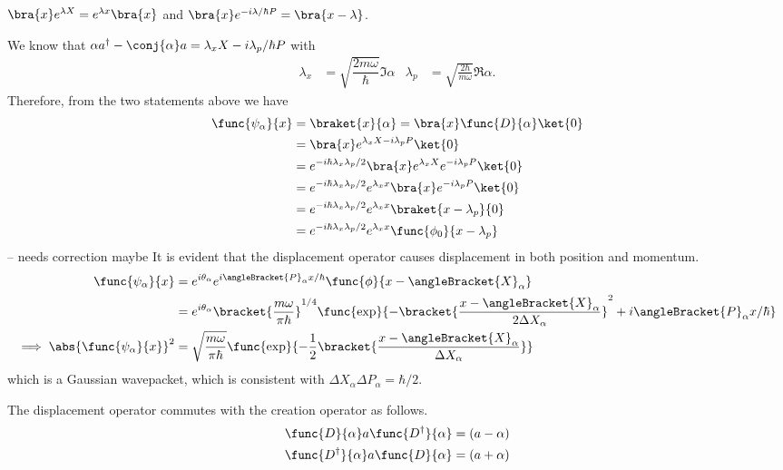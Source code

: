 \begin{lemma}
    \(\bra{x} e^{\lambda X} = e^{\lambda x} \bra{x}\) and \(\bra{x} e^{-i\lambda/\hbar P} = \bra{x - \lambda}\).
\end{lemma}
We know that \(\alpha a^{\dagger} - \conj{\alpha}a = \lambda_x X - i\lambda_p/\hbar P\) with 
\begin{align*}
    \lambda_x &= \sqrt{\dfrac{2m\omega}{\hbar}} \Im \alpha & \lambda_p &= \sqrt{\frac{2\hbar}{m\omega}} \Re \alpha.
\end{align*}
Therefore, from the two statements above we have 
\begin{align*}
    \func{\psi_{\alpha}}{x} &= \braket{x}{\alpha} = \bra{x} \func{D}{\alpha} \ket{0}\\
    &=  \bra{x} e^{\lambda_x X - i\lambda_p P}\ket{0}\\
    &= e^{-i\hbar \lambda_x \lambda_p/2} \bra{x} e^{\lambda_x X} e^{-i\lambda_p P} \ket{0}\\
    &= e^{-i\hbar \lambda_x \lambda_p/2} e^{\lambda_x x} \bra{x} e^{-i\lambda_p P} \ket{0}\\
    &= e^{-i\hbar \lambda_x \lambda_p/2} e^{\lambda_x x} \braket{x - \lambda_p}{0}\\
    &= e^{-i\hbar \lambda_x \lambda_p/2} e^{\lambda_x x} \func{\phi_0}{x - \lambda_p}
\end{align*}
-- needs correction maybe
It is evident that the displacement operator causes displacement in both position and momentum. 
\begin{align*}
    \func{\psi_{\alpha}}{x} &= e^{i \theta_{\alpha}} e^{i \angleBracket{P}_{\alpha} x/\hbar} \func{\phi}{x - \angleBracket{X}_{\alpha}}\\
    &= e^{i \theta_{\alpha}} \bracket{\dfrac{m\omega}{\pi \hbar}}^{1/4} \func{\exp}{- \bracket{\dfrac{x - \angleBracket{X}_{\alpha}}{2 \Delta X_{\alpha}}}^2 + i \angleBracket{P}_{\alpha} x/\hbar}\\
    \implies \abs{\func{\psi_{\alpha}}{x}}^2 &= \sqrt{\dfrac{m\omega}{\pi \hbar}} \func{\exp}{- \frac{1}{2}\bracket{\dfrac{x - \angleBracket{X}_{\alpha}}{ \Delta X_{\alpha}}}}
\end{align*}
which is a Gaussian wavepacket, which is consistent with \(\Delta X_{\alpha} \Delta P_{\alpha} = \hbar/2 \). 

\begin{proposition}
    The displacement operator commutes with the creation operator as follows.
    \begin{align*}
        \func{D}{\alpha} a \func{D^{\dagger}}{\alpha} &= (a - \alpha)\\
        \func{D^{\dagger}}{\alpha} a \func{D}{\alpha} &= (a + \alpha)\\
    \end{align*}
\end{proposition}


